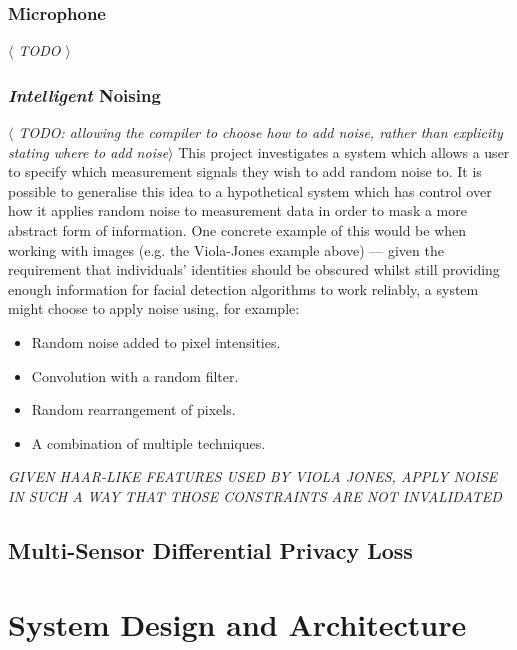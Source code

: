 \documentclass[12pt]{article}
\begin{document}
    \subsubsection{Microphone}
      \textit{$\langle$ TODO $\rangle$}

    \subsubsection{\textit{Intelligent} Noising}
      \textit{$\langle$ TODO: allowing the compiler to choose how to add noise, rather than explicity stating where to add noise$\rangle$}
      This project investigates a system which allows a user to specify which measurement signals they wish to add random noise to. It is possible to generalise this idea to a hypothetical system which has control over how it applies random noise to measurement data in order to mask a more abstract form of information. One concrete example of this would be when working with images (e.g. the  Viola-Jones example above) --- given the requirement that individuals' identities should be obscured whilst still providing enough information for facial detection algorithms to work reliably, a system might choose to apply noise using, for example:

      \begin{itemize}
        \item Random noise added to pixel intensities.
        \item Convolution with a random filter.
        \item Random rearrangement of pixels.
        \item A combination of multiple techniques.
      \end{itemize}

      \textit{GIVEN HAAR-LIKE FEATURES USED BY VIOLA JONES, APPLY NOISE IN SUCH A WAY THAT THOSE CONSTRAINTS ARE NOT INVALIDATED}

  \subsection{Multi-Sensor Differential Privacy Loss} \label{multi_sensor_differential_privacy_loss_section}

\section{System Design and Architecture}
\end{document}
